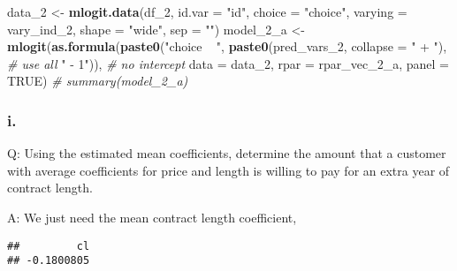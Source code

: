 \documentclass[
]{article}
\newenvironment{Shaded}{\begin{snugshade}}{\end{snugshade}}
\newcommand{\CommentTok}[1]{\textcolor[rgb]{0.56,0.35,0.01}{\textit{#1}}}
\newcommand{\DataTypeTok}[1]{\textcolor[rgb]{0.13,0.29,0.53}{#1}}
\newcommand{\DecValTok}[1]{\textcolor[rgb]{0.00,0.00,0.81}{#1}}
\newcommand{\KeywordTok}[1]{\textcolor[rgb]{0.13,0.29,0.53}{\textbf{#1}}}
\newcommand{\NormalTok}[1]{#1}
\newcommand{\OperatorTok}[1]{\textcolor[rgb]{0.81,0.36,0.00}{\textbf{#1}}}
\newcommand{\OtherTok}[1]{\textcolor[rgb]{0.56,0.35,0.01}{#1}}
\newcommand{\StringTok}[1]{\textcolor[rgb]{0.31,0.60,0.02}{#1}}
\begin{document}
\begin{Shaded}
\begin{Highlighting}[]
\NormalTok{data_}\DecValTok{2}\NormalTok{ <-}\StringTok{ }\KeywordTok{mlogit.data}\NormalTok{(df_}\DecValTok{2}\NormalTok{, }\DataTypeTok{id.var =} \StringTok{"id"}\NormalTok{, }\DataTypeTok{choice =} \StringTok{"choice"}\NormalTok{,}
                      \DataTypeTok{varying =}\NormalTok{ vary_ind_}\DecValTok{2}\NormalTok{, }\DataTypeTok{shape =} \StringTok{"wide"}\NormalTok{, }\DataTypeTok{sep =} \StringTok{""}\NormalTok{)}
\NormalTok{model_}\DecValTok{2}\NormalTok{_a <-}\StringTok{ }\KeywordTok{mlogit}\NormalTok{(}\KeywordTok{as.formula}\NormalTok{(}\KeywordTok{paste0}\NormalTok{(}\StringTok{"choice ~ "}\NormalTok{,}
                                      \KeywordTok{paste0}\NormalTok{(pred_vars_}\DecValTok{2}\NormalTok{,}
                                             \DataTypeTok{collapse =} \StringTok{" + "}\NormalTok{),  }\CommentTok{# use all}
                                      \StringTok{" - 1"}\NormalTok{)),  }\CommentTok{# no intercept}
                    \DataTypeTok{data =}\NormalTok{ data_}\DecValTok{2}\NormalTok{, }\DataTypeTok{rpar =}\NormalTok{ rpar_vec_}\DecValTok{2}\NormalTok{_a, }\DataTypeTok{panel =} \OtherTok{TRUE}\NormalTok{)}
\CommentTok{# summary(model_2_a)}
\end{Highlighting}
\end{Shaded}

\hypertarget{i.-4}{%
\subsubsection{i.}\label{i.-4}}

Q: Using the estimated mean coefficients, determine the amount that a
customer with average coefficients for price and length is willing to
pay for an extra year of contract length.


A: We just need the mean contract length coefficient,

\begin{Shaded}
\end{Shaded}

\begin{verbatim}
##         cl 
## -0.1800805
\end{verbatim}
\end{document}
